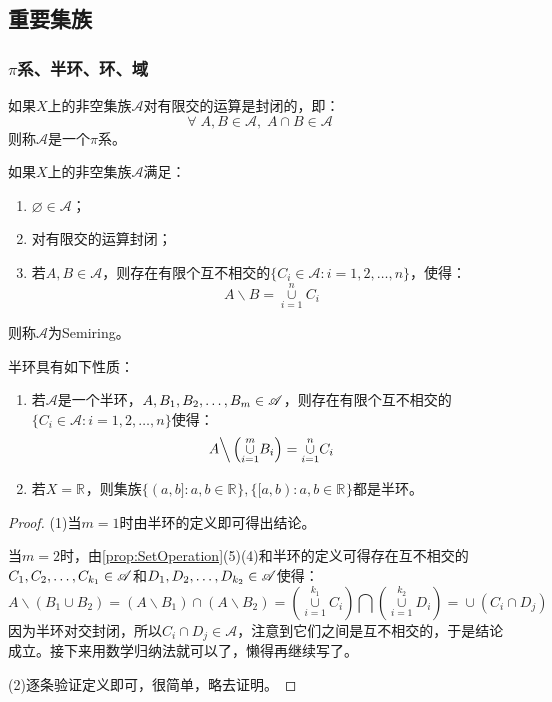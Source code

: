 \subsection{重要集族}
\subsubsection{$\pi$系、半环、环、域}
\begin{definition}
	如果$X$上的非空集族$\mathscr{A}$对有限交的运算是封闭的，即：
	\begin{equation*}
		\forall\;A,B\in\mathscr{A},\;A\cap B\in\mathscr{A}
	\end{equation*}
	则称$\mathscr{A}$是一个$\pi$系。
\end{definition}
\begin{definition}
	如果$X$上的非空集族$\mathscr{A}$满足：
	\begin{enumerate}
		\item $\varnothing\in\mathscr{A}$；
		\item 对有限交的运算封闭；
		\item 若$A,B\in\mathscr{A}$，则存在有限个互不相交的$\{C_i\in\mathscr{A}:i=1,2,\dots,n\}$，使得：
		\begin{equation*}
			A\backslash B=\underset{i=1}{\overset{n}{\cup}}C_i
		\end{equation*}
	\end{enumerate}
	则称$\mathscr{A}$为\gls{Semiring}。
\end{definition}
\begin{property}\label{prop:Semiring}
	半环具有如下性质：
	\begin{enumerate}
		\item 若$\mathscr{A}$是一个半环，$A,B_1, B_2, \dots, B_{m}\in\mathscr{A}$，则存在有限个互不相交的$\{C_i\in\mathscr{A}:i=1,2,\dots,n\}$使得：
		\begin{equation*}
			A\Big\backslash\left(\underset{i=1}{\overset{m}{\cup}}B_i\right)=\underset{i=1}{\overset{n}{\cup}}C_i
		\end{equation*}
		\item 若$X=\mathbb{R}^{}$，则集族$\{(a,b]:a,b\in\mathbb{R}^{}\},\{[a,b):a,b\in\mathbb{R}^{}\}$都是半环。
	\end{enumerate}
\end{property}
\begin{proof}
	(1)当$m=1$时由半环的定义即可得出结论。\par
	当$m=2$时，由\cref{prop:SetOperation}(5)(4)和半环的定义可得存在互不相交的$C_1, C_2, \dots, C_{k_1}\in\mathscr{A}$和$D_1, D_2, \dots, D_{k_2}\in\mathscr{A}$使得：
	\begin{equation*}
		A\backslash(B_1\cup B_2)=(A\backslash B_1)\cap(A\backslash B_2)=\left(\underset{i=1}{\overset{k_1}{\cup}}C_i\right)\bigcap\left(\underset{i=1}{\overset{k_2}{\cup}}D_i\right)=\underset{}{\overset{}{\cup}}(C_i\cap D_j)
	\end{equation*}
	因为半环对交封闭，所以$C_i\cap D_j\in\mathscr{A}$，注意到它们之间是互不相交的，于是结论成立。接下来用数学归纳法就可以了，懒得再继续写了。\par
	(2)逐条验证定义即可，很简单，略去证明。
\end{proof}
